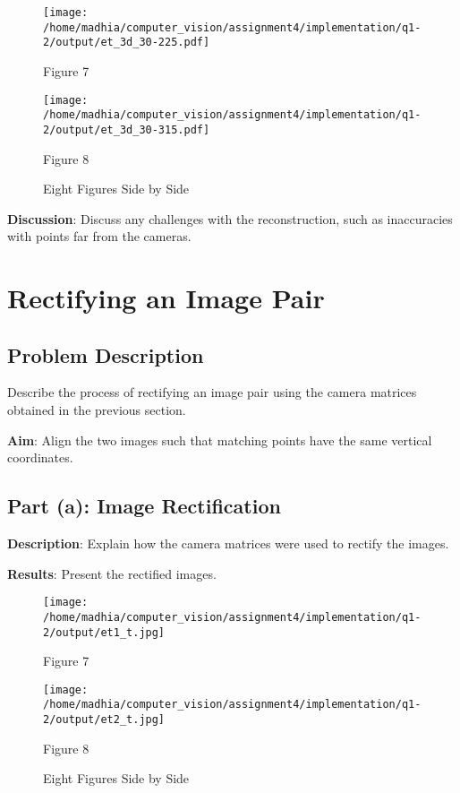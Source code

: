 \documentclass{article}
\begin{document}
\begin{figure}[h!]
    \centering    
    \begin{minipage}{0.4\textwidth}
        \centering
        \texttt{[image: /home/madhia/computer\_vision/assignment4/implementation/q1-2/output/et\_3d\_30-225.pdf]}
        \caption{Figure 7}
    \end{minipage}%
    \begin{minipage}{0.4\textwidth}
        \centering
        \texttt{[image: /home/madhia/computer\_vision/assignment4/implementation/q1-2/output/et\_3d\_30-315.pdf]}
        \caption{Figure 8}
    \end{minipage}
    \caption{Eight Figures Side by Side}
\end{figure}


\textbf{Discussion}: Discuss any challenges with the reconstruction, such as inaccuracies with points far from the cameras.

\section{Rectifying an Image Pair}

\subsection{Problem Description}
Describe the process of rectifying an image pair using the camera matrices obtained in the previous section.

\textbf{Aim}: Align the two images such that matching points have the same vertical coordinates.

\subsection{Part (a): Image Rectification}
\textbf{Description}: Explain how the camera matrices were used to rectify the images.

\textbf{Results}: Present the rectified images.

\begin{figure}[h!]
    \centering    
    \begin{minipage}{0.4\textwidth}
        \centering
        \texttt{[image: /home/madhia/computer\_vision/assignment4/implementation/q1-2/output/et1\_t.jpg]}
        \caption{Figure 7}
    \end{minipage}%
    \begin{minipage}{0.4\textwidth}
        \centering
        \texttt{[image: /home/madhia/computer\_vision/assignment4/implementation/q1-2/output/et2\_t.jpg]}
        \caption{Figure 8}
    \end{minipage}
    \caption{Eight Figures Side by Side}
\end{figure}
\end{document}
